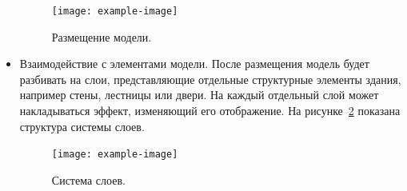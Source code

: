 \begin{itemize}
{        \begin{figure}[ht]
            \centering
            \texttt{[image: example-image]}
            \caption{Размещение модели.}
            \label{figure:CStand}
        \end{figure}

    } 
    \item {
        Взаимодействие с элементами модели.
        После размещения модель будет разбивать на слои,
        представляющие отдельные структурные элементы здания,
        например стены, лестницы или двери.
        На каждый отдельный слой может накладываться эффект,
        изменяющий его отображение.
        На рисунке~\ref{figure:CLayers} показана
        структура системы слоев.

        \begin{figure}[ht]
            \centering
            \texttt{[image: example-image]}
            \caption{Система слоев.}
            \label{figure:CLayers}
        \end{figure}

    } 
\end{itemize}

